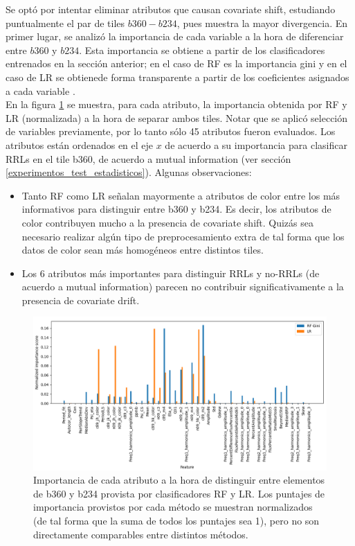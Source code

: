 Se optó por intentar eliminar atributos que causan covariate shift, estudiando puntualmente el par de tiles $b360-b234$, pues muestra la mayor divergencia. En primer lugar, se analizó la importancia de cada variable a la hora de diferenciar entre $b360$ y $b234$. Esta importancia se obtiene a partir de los clasificadores entrenados en la sección anterior; en el caso de RF es la importancia gini y en el caso de LR se obtienede forma transparente a partir de los coeficientes asignados a cada variable \cite{molnar2019}. \\

En la figura \ref{fig:covariate_ranking} se muestra, para cada atributo, la importancia obtenida por RF y LR (normalizada) a la hora de separar ambos tiles. Notar que se aplicó selección de variables previamente, por lo tanto sólo 45 atributos fueron evaluados. Los atributos están ordenados en el eje $x$ de acuerdo a su importancia para clasificar RRLs en el tile b360, de acuerdo a mutual information (ver sección \ref{experimentos_test_estadisticos}). Algunas observaciones:

\begin{itemize}
\item Tanto RF como LR señalan mayormente a atributos de color entre los más informativos para distinguir entre b360 y b234. Es decir, los atributos de color contribuyen mucho a la presencia de covariate shift. Quizás sea necesario realizar algún tipo de preprocesamiento extra de tal forma que los datos de color sean más homogéneos entre distintos tiles.
\item Los 6 atributos más importantes para distinguir RRLs y no-RRLs (de acuerdo a mutual information) parecen no contribuir significativamente a la presencia de covariate drift.
\end{itemize}

\begin{figure}[h!]
\centering
  \includegraphics[width=\textwidth]{Kap8/shift_scores.png}  
\caption{Importancia de cada atributo a la hora de distinguir entre elementos de b360 y b234 provista por clasificadores RF y LR. Los puntajes de importancia provistos por cada método se muestran normalizados (de tal forma que la suma de todos los puntajes sea 1), pero no son directamente comparables entre distintos métodos.}
\label{fig:covariate_ranking}
\end{figure}

